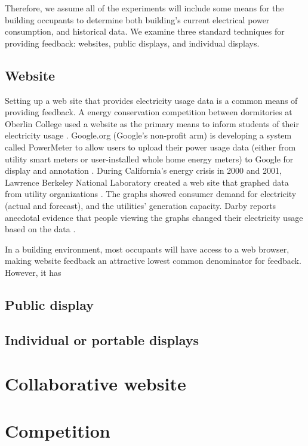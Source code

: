 \documentclass[11pt]{article}
\begin{document}
Therefore, we assume all of the experiments will include some means for the building occupants to determine both building's current electrical power consumption, and historical data. We examine three standard techniques for providing feedback: websites, public displays, and individual displays.

\subsection{Website}

Setting up a web site that provides electricity usage data is a common means of providing feedback. A energy conservation competition between dormitories at Oberlin College used a website as the primary means to inform students of their electricity usage \cite{petersen-dorm-energy-reduction}. Google.org (Google's non-profit arm) is developing a system called PowerMeter to allow users to upload their power usage data (either from utility smart meters or user-installed whole home energy meters) to Google for display and annotation \cite{Google-PowerMeter}. During California's energy crisis in 2000 and 2001, Lawrence Berkeley National Laboratory created a web site that graphed data from utility organizations \cite{Bartholomew2008Current-Energy}. The graphs showed consumer demand for electricity (actual and forecast), and the utilities' generation capacity. Darby reports anecdotal evidence that people viewing the graphs changed their electricity usage based on the data \cite{darby-review-2006}.

In a building environment, most occupants will have access to a web browser, making website feedback an attractive lowest common denominator for feedback. However, it has 


\subsection{Public display}


\subsection{Individual or portable displays}



\section{Collaborative website}

\section{Competition}
\end{document}
